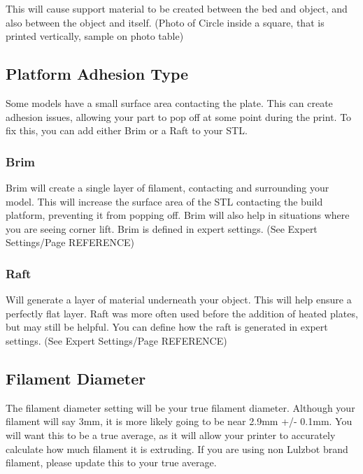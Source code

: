 This will cause support material to be created between the bed and object, and also between the object and itself. (Photo of Circle inside a square, that is printed vertically, sample on photo table)

\subsection{Platform Adhesion Type}

Some models have a small surface area contacting the plate. This can create adhesion issues, allowing your part to pop off at some point during the print. To fix this, you can add either Brim or a Raft to your STL.

\subsubsection{Brim}

Brim will create a single layer of filament, contacting and surrounding your model. This will increase the surface area of the STL contacting the build platform, preventing it from popping off. Brim will also help in situations where you are seeing corner lift. Brim is defined in expert settings. (See Expert Settings/Page REFERENCE)

\subsubsection{Raft}

Will generate a layer of material underneath your object. This will help ensure a perfectly flat layer. Raft was more often used before the addition of heated plates, but may still be helpful. You can define how the raft is generated in expert settings. (See Expert Settings/Page REFERENCE)

\subsection{Filament Diameter}

The filament diameter setting will be your true filament diameter. Although your filament will say 3mm, it is more likely going to be near 2.9mm +/- 0.1mm. You will want this to be a true average, as it will allow your printer to accurately calculate how much filament it is extruding. If you are using non Lulzbot brand filament, please update this to your true average.

